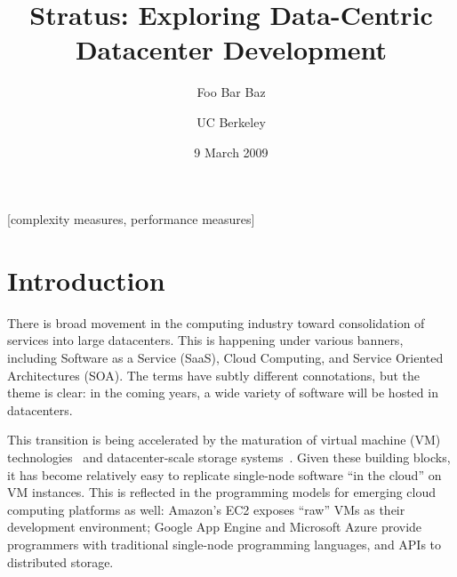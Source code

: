 \documentclass{sig-alternate}
\begin{document}

\newcommand{\BOOM} {Stratus}
\newcommand{\JOL} {LogJam}

\title{\BOOM: Exploring Data-Centric Datacenter Development}
\author{
\alignauthor
Foo
\alignauthor
Bar
\alignauthor
Baz
\and
UC Berkeley
}
\date{9 March 2009}

\maketitle
\begin{abstract}
\end{abstract}

[complexity measures, performance measures]


\section{Introduction}
There is broad movement in the computing industry toward consolidation of  services into large datacenters.  This is happening under various banners, including Software as a Service (SaaS), Cloud Computing, and Service Oriented Architectures (SOA).  The terms have subtly different connotations, but the theme is clear: in the coming years, a wide variety of software will be hosted in datacenters.

This transition is being accelerated by the maturation of virtual machine (VM) technologies~\cite{vmsurvey} and datacenter-scale storage systems~\cite{GFS,S3,SSDS}.  Given these building blocks, it has become relatively easy to replicate single-node software ``in the cloud'' on VM instances.  This is reflected in the programming models for emerging cloud computing platforms as well: Amazon's EC2 exposes ``raw'' VMs as their development environment; Google App Engine and Microsoft Azure provide programmers with traditional single-node programming languages, and APIs to distributed storage.
\end{document}
